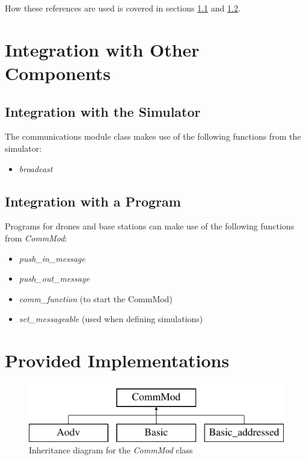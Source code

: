 How these references are used is covered in sections \ref{int-sim} and \ref{int-pro}.

\section{Integration with Other Components}

\subsection{Integration with the Simulator}
\label{int-sim}
The communications module class makes use of the following functions from the simulator:

\begin{itemize}
\item \textit{broadcast}
\end{itemize}

\subsection{Integration with a Program}
\label{int-pro}
Programs for drones and base stations can make use of the following functions from \textit{CommMod}:

\begin{itemize}
\item \textit{push_in_message}
\item \textit{push_out_message}
\item \textit{comm_function} (to start the CommMod)
\item \textit{set_messageable} (used when defining simulations)
\end{itemize}

\section{Provided Implementations}
\begin{figure}
\centering
\includegraphics[scale=0.4]{../documentation/latex/class_comm_mod}	
\caption{Inheritance diagram for the \textit{CommMod} class}
\end{figure}

